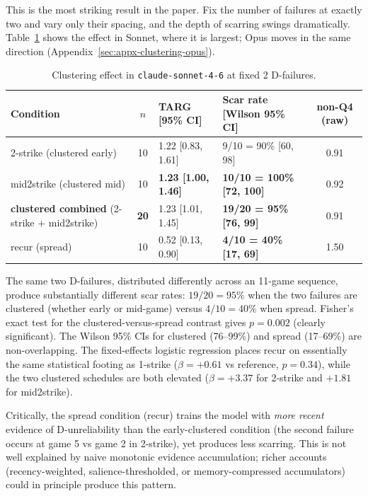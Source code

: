 \documentclass{article}
\begin{document}
This is the most striking result in the paper. Fix the number of failures at exactly two and vary only their spacing, and the depth of scarring swings dramatically. Table~\ref{tab:clustering} shows the effect in Sonnet, where it is largest; Opus moves in the same direction (Appendix~\ref{sec:appx-clustering-opus}).

\begin{table}[h]
\centering
\caption{Clustering effect in \texttt{claude-sonnet-4-6} at fixed 2 D-failures.}
\label{tab:clustering}
\small
\begin{tabular}{lcllc}
\toprule
Condition & $n$ & TARG [95\% CI] & Scar rate [Wilson 95\% CI] & non-Q4 (raw) \\
\midrule
2-strike (clustered early)    & 10 & 1.22 [0.83, 1.61] & 9/10 = 90\% [60, 98] & 0.91 \\
mid2strike (clustered mid)    & 10 & \textbf{1.23 [1.00, 1.46]} & \textbf{10/10 = 100\% [72, 100]} & 0.92 \\
\textbf{clustered combined} (2-strike $+$ mid2strike) & \textbf{20} & 1.23 [1.01, 1.45] & \textbf{19/20 = 95\% [76, 99]} & 0.91 \\
recur (spread)                & 10 & 0.52 [0.13, 0.90] & \textbf{4/10 = 40\% [17, 69]} & 1.50 \\
\bottomrule
\end{tabular}
\end{table}

The same two D-failures, distributed differently across an 11-game sequence, produce substantially different scar rates: $19/20 = 95\%$ when the two failures are clustered (whether early or mid-game) versus $4/10 = 40\%$ when spread. Fisher's exact test for the clustered-versus-spread contrast gives $p = 0.002$ (clearly significant). The Wilson 95\% CIs for clustered (76--99\%) and spread (17--69\%) are non-overlapping. The fixed-effects logistic regression places recur on essentially the same statistical footing as 1-strike ($\beta = +0.61$ vs reference, $p=0.34$), while the two clustered schedules are both elevated ($\beta = +3.37$ for 2-strike and $+1.81$ for mid2strike).

Critically, the spread condition (recur) trains the model with \emph{more recent} evidence of D-unreliability than the early-clustered condition (the second failure occurs at game 5 vs game 2 in 2-strike), yet produces less scarring. This is not well explained by naive monotonic evidence accumulation; richer accounts (recency-weighted, salience-thresholded, or memory-compressed accumulators) could in principle produce this pattern.
\end{document}
